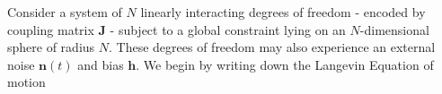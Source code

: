 Consider a system of $N$ linearly interacting degrees of freedom - encoded by coupling matrix $\mathbf{J}$ - subject to a global constraint lying on an $N$-dimensional sphere of radius $N$. These degrees of freedom may also experience an external noise $\mathbf{n}(t)$ and bias $\mathbf{h}$. We begin by writing down the Langevin Equation of motion